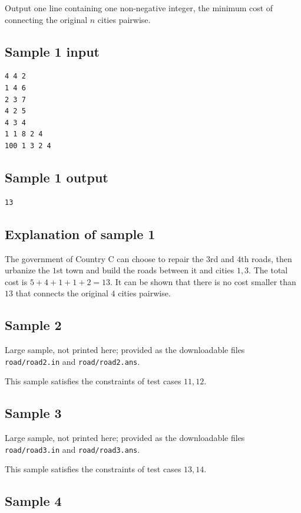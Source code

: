 \documentclass[11pt]{article}
\begin{document}
Output one line containing one non-negative integer, the minimum cost of
connecting the original $n$ cities pairwise.

\subsection*{Sample 1 input}

\begin{verbatim}
4 4 2
1 4 6
2 3 7
4 2 5
4 3 4
1 1 8 2 4
100 1 3 2 4
\end{verbatim}

\subsection*{Sample 1 output}

\begin{verbatim}
13
\end{verbatim}

\subsection*{Explanation of sample 1}

The government of Country C can choose to repair the $3$rd and $4$th roads,
then urbanize the $1$st town and build the roads between it and cities
$1, 3$.
The total cost is $5 + 4 + 1 + 1 + 2 = 13$.
It can be shown that there is no cost smaller than $13$ that connects the
original $4$ cities pairwise.

\subsection*{Sample 2}

Large sample, not printed here;
provided as the downloadable files \texttt{road/road2.in} and \texttt{road/road2.ans}.

This sample satisfies the constraints of test cases $11, 12$.

\subsection*{Sample 3}

Large sample, not printed here;
provided as the downloadable files \texttt{road/road3.in} and \texttt{road/road3.ans}.

This sample satisfies the constraints of test cases $13, 14$.

\subsection*{Sample 4}
\end{document}
